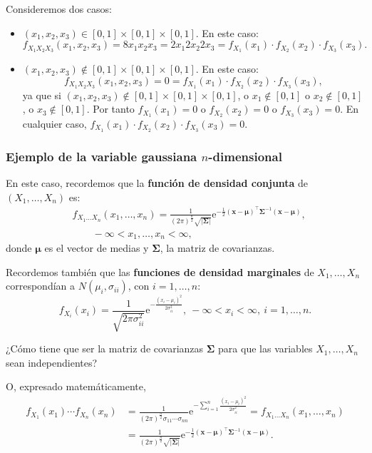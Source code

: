 \documentclass[]{book}
\begin{document}
Consideremos dos casos:

\begin{itemize}
\item
  \((x_1,x_2,x_3)\in [0,1]\times [0,1]\times [0,1]\). En este caso:
  \[
  f_{X_1X_2X_3}(x_1,x_2,x_3) =8 x_1 x_2 x_3 =2 x_1 2 x_2 2 x_3=f_{X_1}(x_1)\cdot f_{X_2}(x_2)\cdot f_{X_3}(x_3).
  \]
\item
  \((x_1,x_2,x_3)\not\in [0,1]\times [0,1]\times [0,1]\). En este caso:
  \[
  f_{X_1X_2X_3}(x_1,x_2,x_3)  =0 = f_{X_1}(x_1)\cdot f_{X_2}(x_2)\cdot f_{X_3}(x_3),
  \]
  ya que si \((x_1,x_2,x_3)\not\in [0,1]\times [0,1]\times [0,1]\), o \(x_1\not\in [0,1]\) o \(x_2\not\in [0,1]\), o \(x_3\not\in [0,1]\). Por tanto \(f_{X_1}(x_1)=0\) o \(f_{X_2}(x_2)=0\) o \(f_{X_3}(x_3)=0\). En cualquier caso, \(f_{X_1}(x_1)\cdot f_{X_2}(x_2)\cdot f_{X_3}(x_3)=0\).
\end{itemize}

\hypertarget{ejemplo-de-la-variable-gaussiana-n-dimensional}{%
\subsubsection{\texorpdfstring{Ejemplo de la variable gaussiana \(n\)-dimensional}{Ejemplo de la variable gaussiana n-dimensional}}\label{ejemplo-de-la-variable-gaussiana-n-dimensional}}

En este caso, recordemos que la \textbf{función de densidad conjunta} de \((X_1,\ldots,X_n)\) es:
\[
\begin{array}{rl}
& f_{X_1\ldots X_n}(x_1,\ldots,x_n)=\frac{1}{(2\pi)^{\frac{n}{2}}\sqrt{\mathbf{|\Sigma|}}}\mathrm{e}^{-\frac{1}{2}(\mathbf{x-\mu})^\top\mathbf{\Sigma}^{-1}(\mathbf{x-\mu})},\\ & \qquad  -\infty <x_1,\ldots,x_n<\infty,
\end{array}
\]
donde \(\mathbf{\mu}\) es el vector de medias y \(\mathbf{\Sigma}\), la matriz de covarianzas.

Recordemos también que las \textbf{funciones de densidad marginales} de \(X_1,\ldots, X_n\) correspondían a \(N(\mu_i,\sigma_{ii})\), con \(i=1,\ldots, n\):
\[
f_{X_i}(x_i)  =\frac{1}{\sqrt{2\pi\sigma_{ii}^2}}\mathrm{e}^{-\frac{(x_i-\mu_i)^2}{2\sigma_{ii}^2}},\ -\infty <x_i<\infty,\ i=1,\ldots,n.
\]

¿Cómo tiene que ser la matriz de covarianzas \(\mathbf{\Sigma}\) para que las variables \(X_1,\ldots,X_n\) sean independientes?

O, expresado matemáticamente,
\[
\begin{array}{rl}
f_{X_1}(x_1)\cdots f_{X_n}(x_n) & =\frac{1}{\left(2\pi\right)^{\frac{n}{2}}\sigma_{11}\cdots \sigma_{nn}}\mathrm{e}^{-\sum\limits_{i=1}^n\frac{(x_i-\mu_i)^2}{2\sigma_{ii}^2}}=f_{X_1\ldots X_n}(x_1,\ldots,x_n) \\ & =\frac{1}{(2\pi)^{\frac{n}{2}}\sqrt{\mathbf{|\Sigma|}}}\mathrm{e}^{-\frac{1}{2}(\mathbf{x-\mu})^\top\mathbf{\Sigma}^{-1}(\mathbf{x-\mu})}.
\end{array}
\]
\end{document}
